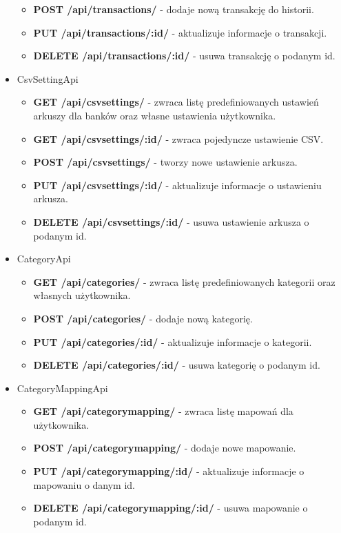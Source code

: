 \documentclass{article}
\begin{document}
\begin{itemize}
\begin{itemize}
				\item \textbf{POST /api/transactions/} - dodaje nową transakcję do historii.
				
				\item \textbf{PUT /api/transactions/:id/} - aktualizuje informacje o transakcji.
				
				\item \textbf{DELETE /api/transactions/:id/} - usuwa transakcję o podanym id.
			\end{itemize}
		\item CsvSettingApi
			\begin{itemize}
				\item \textbf{GET /api/csvsettings/} - zwraca listę predefiniowanych ustawień arkuszy dla banków oraz własne ustawienia użytkownika.
				
				\item \textbf{GET /api/csvsettings/:id/} - zwraca pojedyncze ustawienie CSV.
				
				\item \textbf{POST /api/csvsettings/} - tworzy nowe ustawienie arkusza.
				
				\item \textbf{PUT /api/csvsettings/:id/} - aktualizuje informacje o ustawieniu arkusza.
				
				\item \textbf{DELETE /api/csvsettings/:id/} - usuwa ustawienie arkusza o podanym id.
			\end{itemize}
		\item CategoryApi
			\begin{itemize}
				\item \textbf{GET /api/categories/} - zwraca listę predefiniowanych kategorii oraz własnych użytkownika.
				
				\item \textbf{POST /api/categories/} - dodaje nową kategorię.
				
				\item \textbf{PUT /api/categories/:id/} - aktualizuje informacje o kategorii.
				
				\item \textbf{DELETE /api/categories/:id/} - usuwa kategorię o podanym id.
			\end{itemize}
		\item CategoryMappingApi
			\begin{itemize}
				\item \textbf{GET /api/categorymapping/} - zwraca listę mapowań dla użytkownika.
				
				\item \textbf{POST /api/categorymapping/} - dodaje nowe mapowanie.
				
				\item \textbf{PUT /api/categorymapping/:id/} - aktualizuje informacje o mapowaniu o danym id.
				
				\item \textbf{DELETE /api/categorymapping/:id/} - usuwa mapowanie o podanym id.
			\end{itemize}
	\end{itemize}
\end{document}
